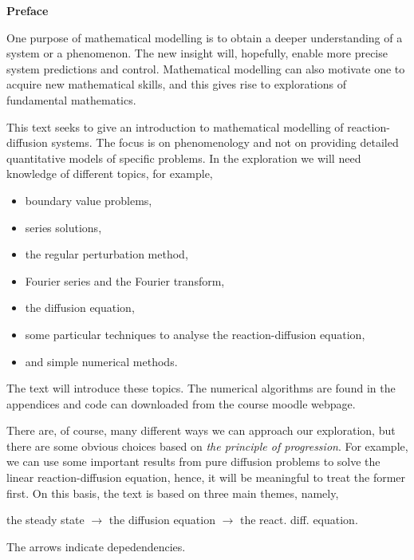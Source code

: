 
\begin{center}{\Large{\textbf{Preface}}}\end{center}

\bigskip 

\noindent One purpose of mathematical modelling is to obtain a deeper understanding of 
a system or a phenomenon. The new insight will, hopefully, enable more precise 
system predictions and control. Mathematical modelling can also motivate one to 
acquire new mathematical skills, and this gives rise to explorations of fundamental mathematics. 

This text seeks to give an introduction to mathematical modelling of 
reaction-diffusion systems. The focus is on phenomenology and not on providing 
detailed quantitative models of specific problems. In the exploration we will 
need knowledge of different topics, for example,  
\begin{itemize}
	\item boundary value problems,
	\item series solutions, 
	\item the regular perturbation method,
	\item Fourier series and the Fourier transform,
	\item the diffusion equation,
	\item some particular techniques to analyse the reaction-diffusion equation,
	\item and simple numerical methods.
\end{itemize}
The text will introduce these topics. The numerical algorithms are 
found in the appendices and code can downloaded from the course moodle webpage.  

There are, of course, many different ways we can approach our exploration, but 
there are some obvious choices based on \emph{the principle of progression}. For example, we can 
use some important results from pure diffusion problems to solve the linear 
reaction-diffusion equation, hence, it will be meaningful to treat the former first. 
On this basis, the text is based on three main themes, namely,  
\begin{center}
	the steady state $\rightarrow$ the diffusion equation $\rightarrow$ the
	react. diff. equation.	
\end{center}
The arrows indicate depedendencies. 

